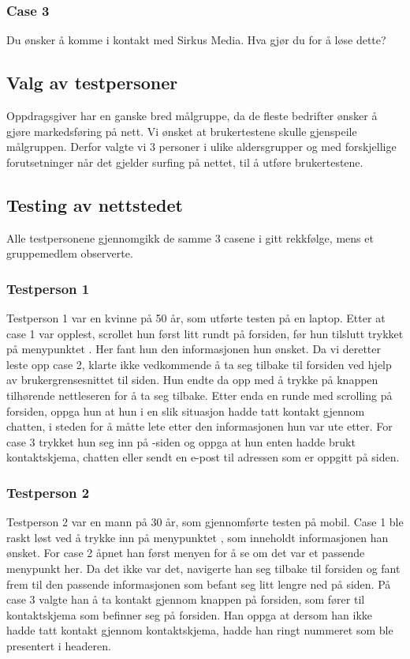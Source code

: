 \subsubsection{Case 3}
Du ønsker å komme i kontakt med Sirkus Media. Hva gjør du for å løse dette?

\subsection{Valg av testpersoner }
Oppdragsgiver har en ganske bred målgruppe, da de fleste bedrifter ønsker å gjøre markedsføring på nett. Vi ønsket at brukertestene skulle gjenspeile målgruppen. Derfor valgte vi 3 personer i ulike aldersgrupper og med forskjellige forutsetninger når det gjelder surfing på nettet, til å utføre brukertestene.

\subsection{Testing av nettstedet}
Alle testpersonene gjennomgikk de samme 3 casene i gitt rekkfølge, mens et gruppemedlem observerte.

\subsubsection{Testperson 1}
Testperson 1 var en kvinne på 50 år, som utførte testen på en laptop. Etter at case 1 var opplest, scrollet hun først litt rundt på forsiden, før hun tilslutt trykket på menypunktet . Her fant hun den informasjonen hun ønsket. Da vi deretter leste opp case 2, klarte ikke vedkommende å ta seg tilbake til forsiden ved hjelp av brukergrensesnittet til siden. Hun endte da opp med å trykke på knappen tilhørende nettleseren for å ta seg tilbake. Etter enda en runde med scrolling på forsiden, oppga hun at hun i en slik situasjon hadde tatt kontakt gjennom chatten, i steden for å måtte lete etter den informasjonen hun var ute etter. For case 3 trykket hun seg inn på -siden og oppga at hun enten hadde brukt kontaktskjema, chatten eller sendt en e-post til adressen som er oppgitt på siden.

\subsubsection{Testperson 2}
Testperson 2 var en mann på 30 år, som gjennomførte testen på mobil. Case 1 ble raskt løst ved å trykke inn på menypunktet , som inneholdt informasjonen han ønsket. For case 2 åpnet han først menyen for å se om det var et passende menypunkt her. Da det ikke var det, navigerte han seg tilbake til forsiden og fant frem til den passende informasjonen som befant seg litt lengre ned på siden. På case 3 valgte han å ta kontakt gjennom knappen på forsiden, som fører til kontaktskjema som befinner seg på forsiden. Han oppga at dersom han ikke hadde tatt kontakt gjennom kontaktskjema, hadde han ringt nummeret som ble presentert i headeren. 

